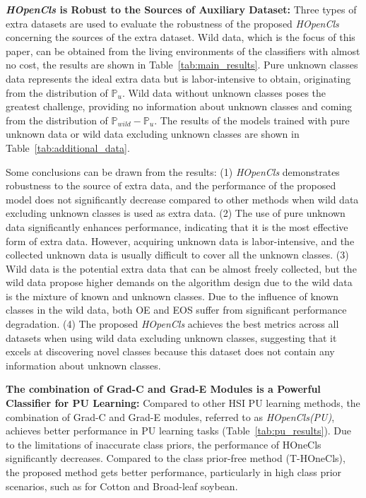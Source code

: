 \noindent \textbf{\textit{HOpenCls} is Robust to the Sources of Auxiliary Dataset:}
Three types of extra datasets are used to evaluate the robustness of the proposed \textit{HOpenCls} concerning the sources of the extra dataset. Wild data, which is the focus of this paper, can be obtained from the living environments of the classifiers with almost no cost, the results are shown in Table~\ref{tab:main_results}. Pure unknown classes data represents the ideal extra data but is labor-intensive to obtain, originating from the distribution of $\mathbb{P}_{u}$. Wild data without unknown classes poses the greatest challenge, providing no information about unknown classes and coming from the distribution of $\mathbb{P}_{wild}-\mathbb{P}_{u}$. The results of the models trained with pure unknown data or wild data excluding unknown classes are shown in Table~\ref{tab:additional_data}.

Some conclusions can be drawn from the results: (1) \textit{HOpenCls} demonstrates robustness to the source of extra data, and the performance of the proposed model does not significantly decrease compared to other methods when wild data excluding unknown classes is used as extra data. (2) The use of pure unknown data significantly enhances performance, indicating that it is the most effective form of extra data. However, acquiring unknown data is labor-intensive, and the collected unknown data is usually difficult to cover all the unknown classes. (3) Wild data is the potential extra data that can be almost freely collected, but the wild data propose higher demands on the algorithm design due to the wild data is the mixture of known and unknown classes. Due to the influence of known classes in the wild data, both OE and EOS suffer from significant performance degradation. (4) The proposed \textit{HOpenCls} achieves the best metrics across all datasets when using wild data excluding unknown classes, suggesting that it excels at discovering novel classes because this dataset does not contain any information about unknown classes.

\noindent \textbf{The combination of Grad-C and Grad-E Modules is a Powerful Classifier for PU Learning:}
Compared to other HSI PU learning methods, the combination of Grad-C and Grad-E modules, referred to as \textit{HOpenCls(PU)}, achieves better performance in PU learning tasks (Table~\ref{tab:pu_results}). Due to the limitations of inaccurate class priors, the performance of HOneCls significantly decreases. Compared to the class prior-free method (T-HOneCls), the proposed method gets better performance, particularly in high class prior scenarios, such as for Cotton and Broad-leaf soybean.

